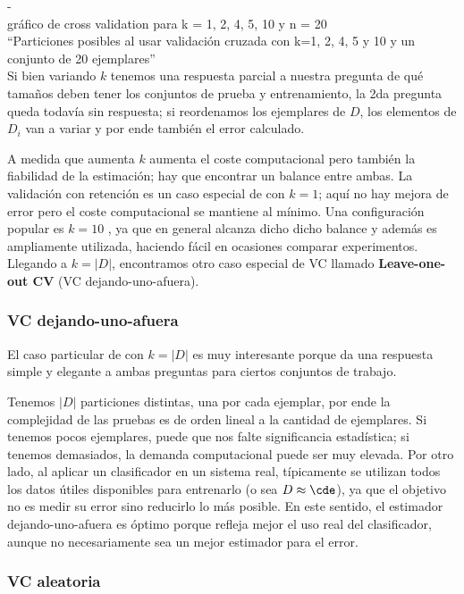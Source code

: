-\\
gráfico de cross validation para k = 1, 2, 4, 5, 10 y n = 20\\
``Particiones posibles al usar validación cruzada con k=1, 2, 4, 5 y 10 y un conjunto de 20 ejemplares''\\

Si bien variando $k$ tenemos una respuesta parcial a nuestra pregunta de qué tamaños deben tener los conjuntos de prueba y entrenamiento, la 2da pregunta queda todavía sin respuesta; si reordenamos los ejemplares de $D$, los elementos de $D_i$ van a variar y por ende también el error calculado.

A medida que aumenta $k$ aumenta el coste computacional pero también la fiabilidad de la estimación; hay que encontrar un balance entre ambas. La validación con retención es un caso especial de \kvc con $k=1$; aquí no hay mejora de error pero el coste computacional se mantiene al mínimo. Una configuración popular es $k=10$ \cite{refaeilzadeh2009,dietterich1998}, ya que en general alcanza dicho dicho balance y además es ampliamente utilizada, haciendo fácil en ocasiones comparar experimentos. Llegando a $k=|D|$, encontramos otro caso especial de VC llamado \textbf{Leave-one-out CV} (VC dejando-uno-afuera).

\subsubsection{VC dejando-uno-afuera}

El caso particular de \kvc con $k=|D|$ es muy interesante porque da una respuesta simple y elegante a ambas preguntas para ciertos conjuntos de trabajo. 

Tenemos $|D|$ particiones distintas, una por cada ejemplar, por ende la complejidad de las pruebas es de orden lineal a la cantidad de ejemplares. Si tenemos pocos ejemplares, puede que nos falte significancia estadística; si tenemos demasiados, la demanda computacional puede ser muy elevada. Por otro lado, al aplicar un clasificador en un sistema real, típicamente se utilizan todos los datos útiles disponibles para entrenarlo (o sea $D \approx \cde$), ya que el objetivo no es medir su error sino reducirlo lo más posible. En este sentido, el estimador dejando-uno-afuera es óptimo porque refleja mejor el uso real del clasificador, aunque no necesariamente sea un mejor estimador para el error.


\subsubsection{VC aleatoria}

